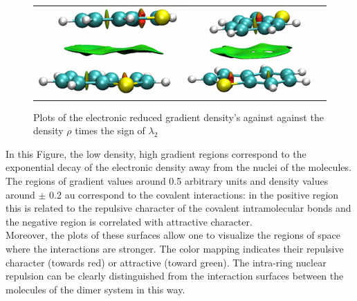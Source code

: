 \begin{figure}[H]
\begin{center}
\begin{tabular}{c c c}
					\includegraphics{image/image/P1-F861} & \includegraphics{image/image/P1-F862} & \\
				\end{tabular}
			\end{center}
			\caption{Plots of the electronic reduced gradient density's against against the density $\rho$ times the sign of $\lambda_{2}$}
		\end{figure}
		
		In this Figure, the low density, high gradient regions correspond to the exponential decay of the electronic density away from the nuclei of the molecules. The regions of gradient values around 0.5 arbitrary units and density values around $\pm$ 0.2 au correspond to the covalent interactions: in the positive region this is related to the repulsive character of the covalent intramolecular bonds and the negative region is correlated with attractive character.\\
		
		Moreover, the plots of these surfaces allow one to visualize the regions of space where the interactions are stronger. The color mapping indicates their repulsive character (towards red) or attractive (toward green). The intra-ring nuclear repulsion can be clearly distinguished from the interaction surfaces between the molecules of the dimer system in this way.\\
		
